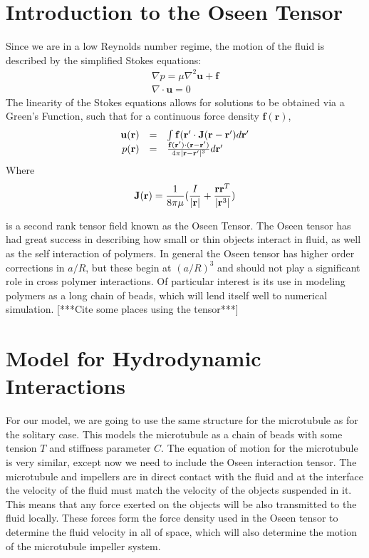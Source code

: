 \documentclass[11pt]{ucthesis}
\def\br{{\bf r}}
\begin{document}
\section{Introduction to the Oseen Tensor}
Since we are in a low Reynolds number regime, the motion of the fluid is described by the simplified Stokes equations:
\begin{equation}
\begin{array}{l}
\nabla p = \mu \nabla^2 \mathbf{u} +  \mathbf{f} \\
\nabla \cdot  \mathbf{u} = 0
\end{array}
\end{equation}
The linearity of the Stokes equations allows for solutions to be obtained via a Green's Function, such that for a continuous force density $ \mathbf{f}( \mathbf{r})$,
\begin{equation}
\label{eq:fluidgreensfunc}
\begin{array}{rcl}
 \mathbf{u}(\br ) &=& \int  \mathbf{f}(\br^\prime \cdot  \mathbf{J} (\br - \br^\prime) d\br^\prime \\
p(\br) &=& \frac{ \mathbf{f}(\br^\prime) \cdot (\br - \br^\prime)}{4 \pi | \br - \br^\prime|^3} d\br^\prime
\end{array}
\end{equation}
Where 
\begin{equation}
\label{eq:oseentensordef}
 \mathbf{J}(\br) = \frac{1}{8\pi\mu} ( \frac{I}{|\br|} + \frac{\br\br^T}{|\br^3|})
\end{equation}

is a second rank tensor field known as the Oseen Tensor.
The Oseen tensor has had great success in describing how small or thin objects interact in fluid, as well as the self interaction of polymers. 
In general the Oseen tensor has higher order corrections in $a/R$, but these begin at $(a/R)^3$ and should not play a significant role in cross polymer interactions.
Of particular interest is its use in modeling polymers as a long chain of beads, which will lend itself well to numerical simulation.
[***Cite some places using the tensor***]

\section{Model for Hydrodynamic Interactions}
For our model, we are going to use the same structure for the microtubule as for the solitary case. This models the microtubule as a chain of beads with some tension $T$ and stiffness parameter $C$. The equation of motion for the microtubule is very similar, except now we need to include the Oseen interaction tensor.
The microtubule and impellers are in direct contact with the fluid and at the interface the velocity of the fluid must match the velocity of the objects suspended in it.
This means that any force exerted on the objects will be also transmitted to the fluid locally. 
These forces form the force density used in the Oseen tensor to determine the fluid velocity in all of space, which will also determine the motion of the microtubule impeller system.
\end{document}
